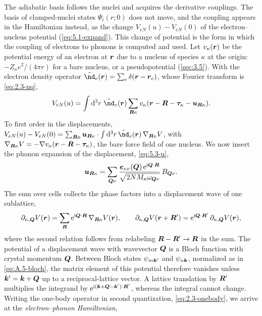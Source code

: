 The adiabatic basis follows the nuclei and acquires the derivative couplings. The basis of clamped-nuclei states $\Psi_i(r;0)$ does not move, and the coupling appears in the Hamiltonian instead, as the change $V_{eN}(u) - V_{eN}(0)$ of the electron--nucleus potential (\cref{eq:5.1-expand}). This change of potential is the form in which the coupling of electrons to phonons is computed and used. Let $v_\kappa(\bm{r})$ be the potential energy of an electron at $\bm{r}$ due to a nucleus of species $\kappa$ at the origin: $-Z_\kappa e^2/(4\pi r)$ for a bare nucleus, or a pseudopotential (\cref{sec:3.5}). With the electron density operator $\op{\nd}_e(\vect{r}) = \sum_e\delta(\vect{r} - \vect{r}_e)$, whose Fourier transform is \cref{eq:2.3-nq},
\begin{equation*}
  V_{eN}(u) = \int\dd^3r\;\op{\nd}_e(\vect{r})\sum_{\vect{R}\kappa}v_\kappa(\vect{r} - \vect{R} - \vect{\tau}_\kappa - \vect{u}_{\vect{R}\kappa}) .
\end{equation*}
To first order in the displacements, $V_{eN}(u) - V_{eN}(0) = \sum_{\vect{R}\kappa}\vect{u}_{\vect{R}\kappa}\cdot\int\dd^3r\,\op{\nd}_e(\vect{r})\,\nabla_{\vect{R}\kappa}V$, with $\nabla_{\bm{R}\kappa}V = -\nabla v_\kappa(\bm{r} - \bm{R} - \bm{\tau}_\kappa)$, the bare force field of one nucleus. We now insert the phonon expansion of the displacement, \cref{eq:5.3-u},
\begin{equation*}
  \bm{u}_{\bm{R}\kappa} = \sum_{\bm{Q}\nu}\frac{\bm{e}_{\kappa\nu}(\bm{Q})\,\mathrm{e}^{\mathrm{i}\bm{Q}\cdot\bm{R}}}{\sqrt{2NM_\kappa\omega_{\bm{Q}\nu}}}\,B_{\bm{Q}\nu} .
\end{equation*}
The sum over cells collects the phase factors into a displacement wave of one sublattice,
\begin{equation*}
  \partial_{\kappa,\bm{Q}}V(\bm{r}) = \sum_{\bm{R}}\mathrm{e}^{\mathrm{i}\bm{Q}\cdot\bm{R}}\,\nabla_{\bm{R}\kappa}V(\bm{r}) ,
  \qquad \partial_{\kappa,\bm{Q}}V(\bm{r} + \bm{R}') = \mathrm{e}^{\mathrm{i}\bm{Q}\cdot\bm{R}'}\,\partial_{\kappa,\bm{Q}}V(\bm{r}) ,
\end{equation*}
where the second relation follows from relabeling $\bm{R} - \bm{R}' \to \bm{R}$ in the sum. The potential of a displacement wave with wavevector $\bm{Q}$ is a Bloch function with crystal momentum $\bm{Q}$. Between Bloch states $\psi_{m\bm{k}'}$ and $\psi_{n\bm{k}}$, normalized as in \cref{eq:A.5-bloch}, the matrix element of this potential therefore vanishes unless $\bm{k}' = \bm{k} + \bm{Q}$ up to a reciprocal-lattice vector. A lattice translation by $\bm{R}'$ multiplies the integrand by $\mathrm{e}^{\mathrm{i}(\bm{k} + \bm{Q} - \bm{k}')\cdot\bm{R}'}$, whereas the integral cannot change. Writing the one-body operator in second quantization, \cref{eq:2.3-onebody}, we arrive at the \emph{electron--phonon Hamiltonian},
